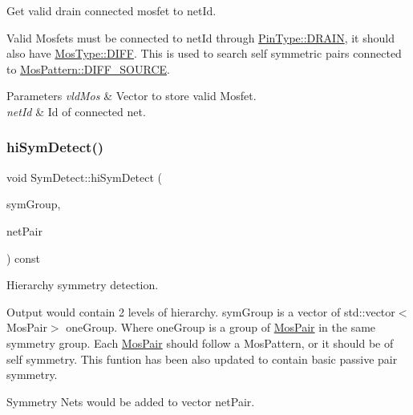 Get valid drain connected mosfet to net\+Id. 

Valid Mosfets must be connected to net\+Id through \hyperlink{type_8h_afaab50027002ecbb6c8ac27e727d1bb4ad22e8f7ce637479aeffe9dab9ee7337d}{Pin\+Type\+::\+D\+R\+A\+IN}, it should also have \hyperlink{type_8h_a34a6a66323cfecf83dfe00bc8fd96333aa2e1ec2dd3d8195d238c5494f0ac5578}{Mos\+Type\+::\+D\+I\+FF}. This is used to search self symmetric pairs connected to \hyperlink{type_8h_af19eddb079bfea723256710b029c38e8ad45b64a7d6b85dde1b52dd5a18863933}{Mos\+Pattern\+::\+D\+I\+F\+F\+\_\+\+S\+O\+U\+R\+CE}.


\begin{DoxyParams}{Parameters}
{\em vld\+Mos} & Vector to store valid Mosfet. \\
\hline
{\em net\+Id} & Id of connected net. \\
\hline
\end{DoxyParams}
\mbox{\label{classSymDetect_a961c1dec1cb00000c9ed107dedac50ec}} 
\subsubsection{\texorpdfstring{hi\+Sym\+Detect()}{hiSymDetect()}}
{\footnotesize\ttfamily void Sym\+Detect\+::hi\+Sym\+Detect (\begin{DoxyParamCaption}\item[{std\+::vector$<$ std\+::vector$<$ \hyperlink{classMosPair}{Mos\+Pair} $>$$>$ \&}]{sym\+Group,  }\item[{std\+::vector$<$ \hyperlink{classNetPair}{Net\+Pair} $>$ \&}]{net\+Pair }\end{DoxyParamCaption}) const\hspace{0.3cm}{\ttfamily [private]}}



Hierarchy symmetry detection. 

Output would contain 2 levels of hierarchy. sym\+Group is a vector of std\+::vector$<$\+Mos\+Pair$>$ one\+Group. Where one\+Group is a group of \hyperlink{classMosPair}{Mos\+Pair} in the same symmetry group. Each \hyperlink{classMosPair}{Mos\+Pair} should follow a Mos\+Pattern, or it should be of self symmetry. This funtion has been also updated to contain basic passive pair symmetry.

Symmetry Nets would be added to vector net\+Pair.


